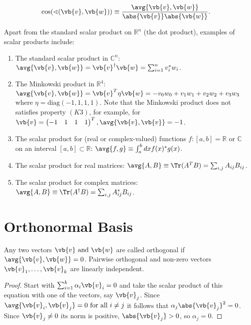 \documentclass[a4paper,12pt]{report}
\begin{document}
\begin{equation}
    \cos (\sphericalangle (\vb{v} ,\vb{w} )) \equiv \frac{\avg{\vb{v} ,\vb{w} } }{\abs{\vb{v} }\abs{\vb{w} }  }. 
\end{equation}


Apart from the standard scalar product on \(\mathbb{R}^{n} \) (the dot product), examples of scalar products include:

\begin{enumerate}
    \item The standard scalar product in \(\mathbb{C}^{n} \):\(\avg{\vb{v} ,\vb{w} } = \vb{v} ^{\dagger} \vb{w} = \sum_{i=1}^{n} v_{i}^*w_{i} \).
    \item The Minkowski product in \(\mathbb{R}^{4} \): \(\avg{\vb{v} ,\vb{w} } = \vb{v} ^{T} \eta \vb{w} = -v_0 w_0 + v_1 w_1 +v_2 w_2 +v_3 w_3    \) where \(\eta = \text{diag}  (-1,1,1,1)\). Note that the Minkowski product does not satisfies property \((K3)\), for example, for \(\vb{v} = \begin{pmatrix}
        -1 & 1 & 1 &  1 \\
    \end{pmatrix}^{T} , \avg{\vb{v} ,\vb{v} }  = -1\).
    \item The scalar product for (real or complex-valued) functions \(f: [a,b] = \mathbb{R}\text { or } \mathbb{C}\) on an interval \([a,b] \subset \mathbb{R}\): \(\avg{f,g} \equiv \int_{a}^{b} dx f(x)^{*} g(x)\). 
    \item The scalar product for real matrices: \(\avg{A, B} \equiv \Tr (A^{T}B ) = \sum_{i,j}^{} A_{ij} B_{ij}\).
    \item The scalar product for complex matrices: \(\avg{A, B} \equiv \Tr (A^{\dagger} B ) = \sum_{i,j}^{} A_{ij}^* B_{ij}\).
\end{enumerate}

\section{Orthonormal Basis}

\begin{lemma}
Any two vectors \(\vb{v} \text { and } \vb{w} \) are called orthogonal if \(\avg{\vb{v} ,\vb{w} } = 0\). Pairwise orthogonal and non-zero vectors \(\vb{v} _{1}, \hdots , \vb{v} _{k}  \) are linearly independent.  
\end{lemma}

\begin{proof}
Start with \(\sum_{i=1}^{k} \alpha _{i}\vb{v} _{i} = 0 \) and take the scalar product of this equation with one of the vectors, say \(\vb{v} _{j} \). Since \(\avg{\vb{v} _{i} , \vb{v} _{j} } = 0 \text{ for all } i \neq j\) it follows that \(\alpha _{j}\abs{\vb{v} _{j} }^2 = 0  \). Since \(\vb{v} _{j} \neq 0 \) its norm is positive, \(\abs{\vb{v} _{j} } > 0 \), so \(\alpha _{j} = 0 \).       

\end{proof}
\end{document}
